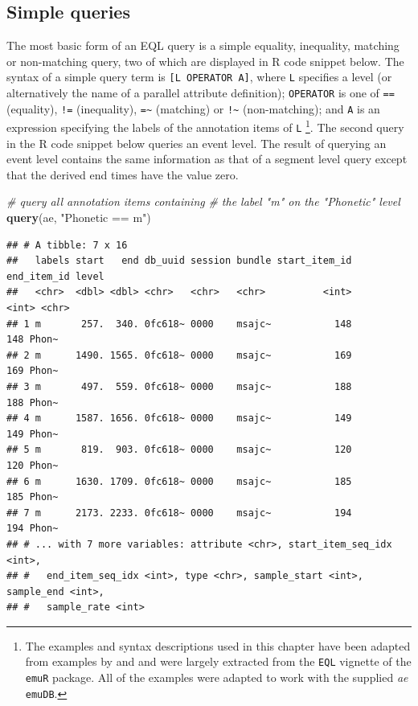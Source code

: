 \documentclass[]{book}
\newenvironment{Shaded}{\begin{snugshade}}{\end{snugshade}}
\newcommand{\CommentTok}[1]{\textcolor[rgb]{0.56,0.35,0.01}{\textit{#1}}}
\newcommand{\KeywordTok}[1]{\textcolor[rgb]{0.13,0.29,0.53}{\textbf{#1}}}
\newcommand{\NormalTok}[1]{#1}
\newcommand{\StringTok}[1]{\textcolor[rgb]{0.31,0.60,0.02}{#1}}
\begin{document}
\hypertarget{simple-queries}{%
\subsection{Simple queries}\label{simple-queries}}

The most basic form of an EQL query is a simple equality, inequality, matching or non-matching query, two of which are displayed in R code snippet below. The syntax of a simple query term is \texttt{{[}L\ OPERATOR\ A{]}}, where \texttt{L} specifies a level (or alternatively the name of a parallel attribute definition); \texttt{OPERATOR} is one of \texttt{==} (equality), \texttt{!=} (inequality), \texttt{=\textasciitilde{}} (matching) or \texttt{!\textasciitilde{}} (non-matching); and \texttt{A} is an expression specifying the labels of the annotation items of \texttt{L} \footnote{The examples and syntax descriptions used in this chapter have been adapted from examples by \citet{cassidy:sc2001a} and \citet{harrington:2002aa} and were largely extracted from the \texttt{EQL} vignette of the \texttt{emuR} package. All of the examples were adapted to work with the supplied \emph{ae} \texttt{emuDB}.}. The second query in the R code snippet below queries an event level. The result of querying an event level contains the same information as that of a segment level query except that the derived end times have the value zero.

\begin{Shaded}
\begin{Highlighting}[]
\CommentTok{# query all annotation items containing}
\CommentTok{# the label "m" on the "Phonetic" level}
\KeywordTok{query}\NormalTok{(ae, }\StringTok{"Phonetic == m"}\NormalTok{)}
\end{Highlighting}
\end{Shaded}

\begin{verbatim}
## # A tibble: 7 x 16
##   labels start   end db_uuid session bundle start_item_id end_item_id level
##   <chr>  <dbl> <dbl> <chr>   <chr>   <chr>          <int>       <int> <chr>
## 1 m       257.  340. 0fc618~ 0000    msajc~           148         148 Phon~
## 2 m      1490. 1565. 0fc618~ 0000    msajc~           169         169 Phon~
## 3 m       497.  559. 0fc618~ 0000    msajc~           188         188 Phon~
## 4 m      1587. 1656. 0fc618~ 0000    msajc~           149         149 Phon~
## 5 m       819.  903. 0fc618~ 0000    msajc~           120         120 Phon~
## 6 m      1630. 1709. 0fc618~ 0000    msajc~           185         185 Phon~
## 7 m      2173. 2233. 0fc618~ 0000    msajc~           194         194 Phon~
## # ... with 7 more variables: attribute <chr>, start_item_seq_idx <int>,
## #   end_item_seq_idx <int>, type <chr>, sample_start <int>, sample_end <int>,
## #   sample_rate <int>
\end{verbatim}
\end{document}
